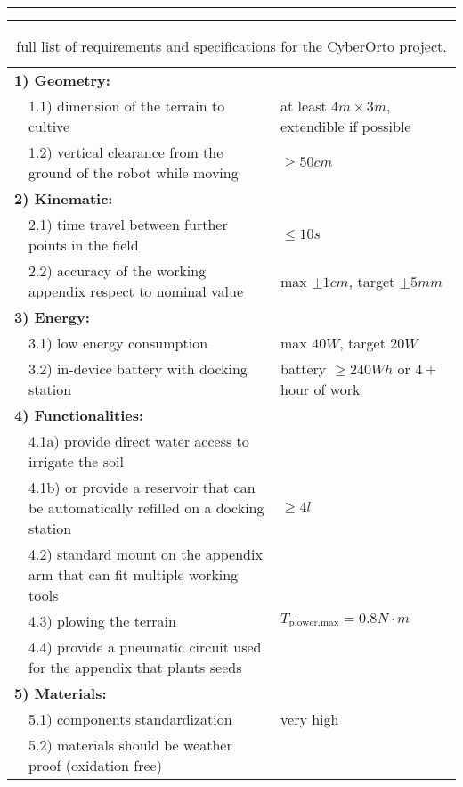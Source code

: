\begin{table}[pbt]
	\rule{\linewidth}{2pt}
	\caption{full list of requirements and specifications for the CyberOrto project.}
	\label{tab:requirementsspecifications}
	\rule{\linewidth}{1pt} \vspace{0mm}	
	
	\centering
	\begin{tabular}{p{0.2cm} p{8cm} p{5cm} }
		\multicolumn{2}{l}{ \textbf{1) Geometry:} } \\
		& 1.1) dimension of the terrain to cultive & at least $4m\times 3m$, extendible if possible \\
		& 1.2) vertical clearance from the ground of the robot while moving & $\geq 50cm$ \\
		
		\multicolumn{2}{l}{ \textbf{2) Kinematic:} } \\
		& 2.1) time travel between further points in the field & $ \leq 10s$ \\	
		& 2.2) accuracy of the working appendix respect to nominal value & max $\pm 1cm$, target $\pm 5mm$ \\		
		
		\multicolumn{2}{l}{ \textbf{3) Energy:} } \\
		& 3.1) low energy consumption & max $40W$, target $20W$ \\
		& 3.2) in-device battery with docking station & battery $\geq 240 Wh$ or $4+$ hour of work\\
				
		\multicolumn{2}{l}{ \textbf{4) Functionalities:} } \\
		& 4.1a) provide direct water access to irrigate the soil \\
		& 4.1b) or provide a reservoir that can be automatically refilled on a docking station & $\geq 4l$ \\
		& 4.2) standard mount on the appendix arm that can fit multiple working tools \\
		& 4.3) plowing the terrain & $T_\textrm{plower,max} = 0.8 N\cdot m $\\
		& 4.4) provide a pneumatic circuit used for the appendix that plants seeds \\
		
		\multicolumn{2}{l}{ \textbf{5) Materials:} } \\
		& 5.1) components standardization & very high \\
		& 5.2) materials should be weather proof (oxidation free) \\
		

\end{tabular}
\end{table}
